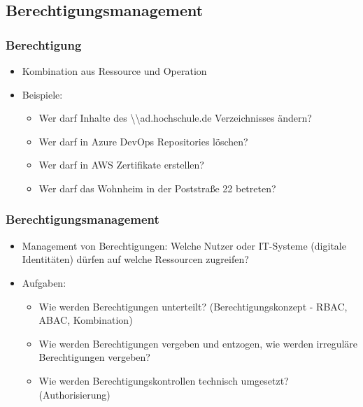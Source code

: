 \documentclass[11pt]{beamer}
\begin{document}
\subsection{Berechtigungsmanagement}
\begin{frame}
  \frametitle{Berechtigung}
  \begin{itemize}
    \item Kombination aus Ressource und Operation~
    \item Beispiele:
          \begin{itemize}
            \item Wer darf Inhalte des \textbackslash{}\textbackslash{}ad.hochschule.de Verzeichnisses ändern?
            \item Wer darf in Azure DevOps Repositories löschen?
            \item Wer darf in AWS Zertifikate erstellen?
            \item Wer darf das Wohnheim in der Poststraße 22 betreten?
          \end{itemize}
  \end{itemize}
\end{frame}

\begin{frame}
  \frametitle{Berechtigungsmanagement}
  \begin{itemize}
    \item Management von Berechtigungen: Welche Nutzer oder IT-Systeme (digitale Identitäten) dürfen auf welche Ressourcen zugreifen?
    \item Aufgaben:
          \begin{itemize}
            \item Wie werden Berechtigungen unterteilt? (Berechtigungskonzept - RBAC, ABAC, Kombination)
            \item Wie werden Berechtigungen vergeben und entzogen, wie werden irreguläre Berechtigungen vergeben?
            \item Wie werden Berechtigungskontrollen technisch umgesetzt? (Authorisierung)
          \end{itemize}
  \end{itemize}
\end{frame}

\end{document}
